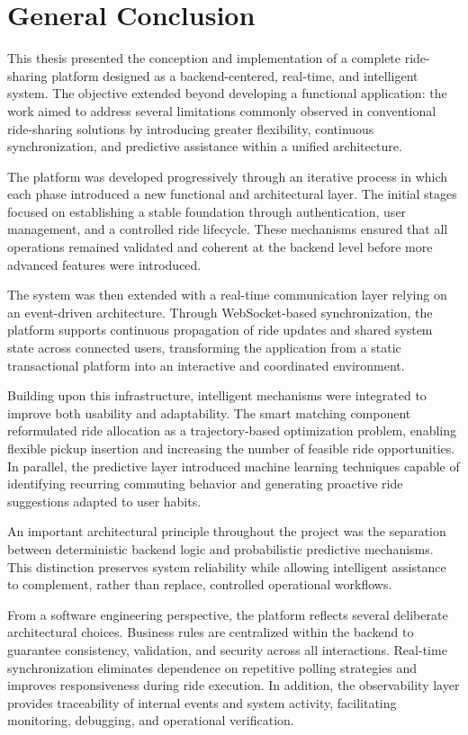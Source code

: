 \section*{General Conclusion}

This thesis presented the conception and implementation of a complete ride-sharing platform designed as a backend-centered, real-time, and intelligent system. The objective extended beyond developing a functional application: the work aimed to address several limitations commonly observed in conventional ride-sharing solutions by introducing greater flexibility, continuous synchronization, and predictive assistance within a unified architecture.

The platform was developed progressively through an iterative process in which each phase introduced a new functional and architectural layer. The initial stages focused on establishing a stable foundation through authentication, user management, and a controlled ride lifecycle. These mechanisms ensured that all operations remained validated and coherent at the backend level before more advanced features were introduced.

The system was then extended with a real-time communication layer relying on an event-driven architecture. Through WebSocket-based synchronization, the platform supports continuous propagation of ride updates and shared system state across connected users, transforming the application from a static transactional platform into an interactive and coordinated environment.

Building upon this infrastructure, intelligent mechanisms were integrated to improve both usability and adaptability. The smart matching component reformulated ride allocation as a trajectory-based optimization problem, enabling flexible pickup insertion and increasing the number of feasible ride opportunities. In parallel, the predictive layer introduced machine learning techniques capable of identifying recurring commuting behavior and generating proactive ride suggestions adapted to user habits.

An important architectural principle throughout the project was the separation between deterministic backend logic and probabilistic predictive mechanisms. This distinction preserves system reliability while allowing intelligent assistance to complement, rather than replace, controlled operational workflows.

From a software engineering perspective, the platform reflects several deliberate architectural choices. Business rules are centralized within the backend to guarantee consistency, validation, and security across all interactions. Real-time synchronization eliminates dependence on repetitive polling strategies and improves responsiveness during ride execution. In addition, the observability layer provides traceability of internal events and system activity, facilitating monitoring, debugging, and operational verification.


